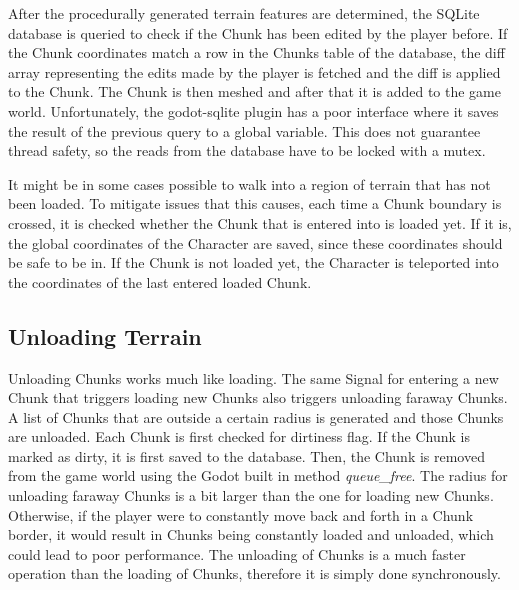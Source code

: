 \documentclass{report}
\begin{document}
After the procedurally generated terrain features are determined, the SQLite database is queried to check if the Chunk has been edited by the player before. If the Chunk coordinates match a row in the Chunks table of the database, the diff array representing the edits made by the player is fetched and the diff is applied to the Chunk. The Chunk is then meshed and after that it is added to the game world. Unfortunately, the godot-sqlite plugin has a poor interface where it saves the result of the previous query to a global variable. This does not guarantee thread safety, so the reads from the database have to be locked with a mutex.\par
It might be in some cases possible to walk into a region of terrain that has not been loaded. To mitigate issues that this causes, each time a Chunk boundary is crossed, it is checked whether the Chunk that is entered into is loaded yet. If it is, the global coordinates of the Character are saved, since these coordinates should be safe to be in. If the Chunk is not loaded yet, the Character is teleported into the coordinates of the last entered loaded Chunk.
\subsection{Unloading Terrain}
Unloading Chunks works much like loading. The same Signal for entering a new Chunk that triggers loading new Chunks also triggers unloading faraway Chunks. A list of Chunks that are outside a certain radius is generated and those Chunks are unloaded. Each Chunk is first checked for dirtiness flag. If the Chunk is marked as dirty, it is first saved to the database. Then, the Chunk is removed from the game world using the Godot built in method \textit{queue\_free}. The radius for unloading faraway Chunks is a bit larger than the one for loading new Chunks. Otherwise, if the player were to constantly move back and forth in a Chunk border, it would result in Chunks being constantly loaded and unloaded, which could lead to poor performance. The unloading of Chunks is a much faster operation than the loading of Chunks, therefore it is simply done synchronously.
\end{document}
